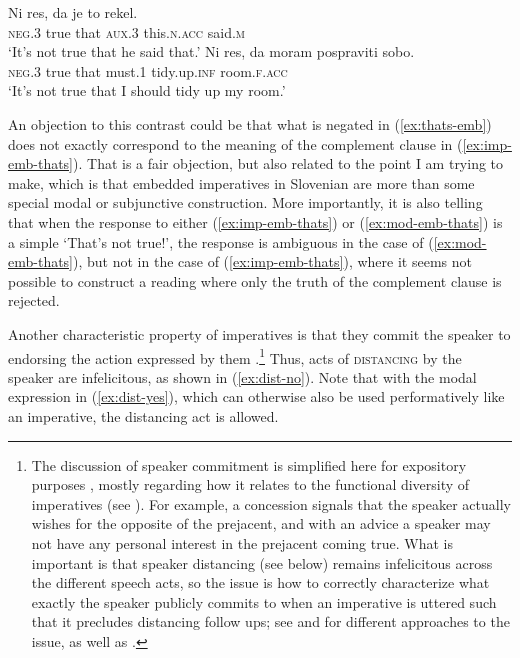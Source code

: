 \documentclass[output=paper,colorlinks,citecolor=brown]{langscibook}
\begin{document}
\ea\label{ex:thats}
\ea \label{ex:thats-matx}
\gll Ni res, da je to rekel.\\
     \textsc{neg.3} true that \textsc{aux.3} this.\textsc{n.acc} said.\textsc{m}\\
\glt `It's not true that he said that.'     
\ex \label{ex:thats-emb}
\gll Ni res, da moram pospraviti sobo.\\
    \textsc{neg.3} true that must.\textsc{1} tidy.up.\textsc{inf} room.\textsc{f.acc}\\
\glt `It's not true that I should tidy up my room.'   \z\z  

\noindent An objection to this contrast could be that what is negated in (\ref{ex:thats-emb}) does not exactly correspond to the meaning of the complement clause in (\ref{ex:imp-emb-thats}). That is a fair objection, but also related to the point I am trying to make, which is that embedded imperatives in Slovenian are more than some special modal or subjunctive construction. More importantly, it is also telling that when the response to either (\ref{ex:imp-emb-thats}) or (\ref{ex:mod-emb-thats}) is a simple `That's not true!', the response is ambiguous in the case of (\ref{ex:mod-emb-thats}), but not in the case of (\ref{ex:imp-emb-thats}), where it seems not possible to construct a reading where only the truth of the complement clause is rejected.  

Another characteristic property of imperatives is that they commit the speaker to endorsing the action expressed by them \citep[][]{kaufmannBOOK,condoravdi-lauer12cssp,condoravdi-lauer17}.\footnote{The discussion of speaker commitment is simplified here for expository purposes \citep[for more detailed discussion, see][]{kaufmannBOOK,kaufmann16,condoravdi-lauer12cssp}, mostly regarding how it relates to the functional diversity of imperatives (see ). For example, a concession signals that the speaker actually wishes for the opposite of the prejacent, and with an advice a speaker may not have any personal interest in the prejacent coming true. What is important is that speaker distancing (see below) remains infelicitous across the different speech acts, so the issue is how to correctly characterize what exactly the speaker publicly commits to when an imperative is uttered such that it precludes distancing follow ups; see \citet{kaufmannBOOK,kaufmann16} and \citet{condoravdi-lauer12cssp} for different approaches to the issue, as well as .} Thus, acts of \textsc{distancing} by the speaker are infelicitous, as shown in (\ref{ex:dist-no}). Note that with the modal expression in (\ref{ex:dist-yes}), which can otherwise also be used performatively like an imperative, the distancing act is allowed.%
\end{document}
